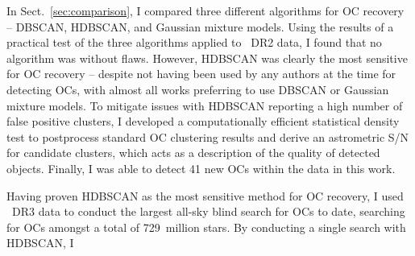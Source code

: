 In Sect.~\ref{sec:comparison}, I compared three different algorithms for OC recovery -- DBSCAN, HDBSCAN, and Gaussian mixture models. Using the results of a practical test of the three algorithms applied to \gaia\ DR2 data, I found that no algorithm was without flaws. However, HDBSCAN was clearly the most sensitive for OC recovery -- despite not having been used by any authors at the time for detecting OCs, with almost all works preferring to use DBSCAN or Gaussian mixture models. To mitigate issues with HDBSCAN reporting a high number of false positive clusters, I developed a computationally efficient statistical density test to postprocess standard OC clustering results and derive an astrometric S/N for candidate clusters, which acts as a description of the quality of detected objects. Finally, I was able to detect 41 new OCs within the data in this work. 

Having proven HDBSCAN as the most sensitive method for OC recovery, I used \gaia\ DR3 data to conduct the largest all-sky blind search for OCs to date, searching for OCs amongst a total of 729~million stars. By conducting a single search with HDBSCAN, I 






